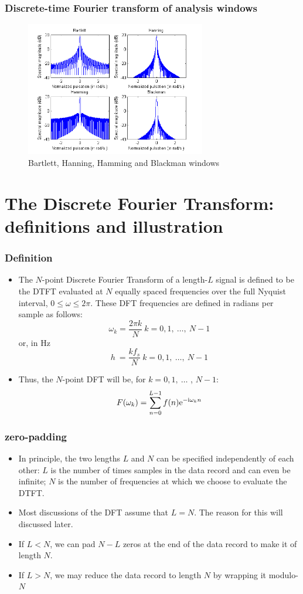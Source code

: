 \begin{frame}
\frametitle{Discrete-time Fourier transform of analysis windows}
\begin{figure}
  \centering
  \includegraphics[width=0.7\textwidth]{spectralwindow}
  \caption{Bartlett, Hanning, Hamming and Blackman windows}
\end{figure}
\end{frame}


\section{The Discrete Fourier Transform: definitions and illustration}
\begin{frame}
\frametitle{Definition}
\begin{itemize}
\item The $N$-point \alert{Discrete Fourier Transform} of a length-$L$ signal is defined to be the DTFT evaluated at $N$ equally spaced frequencies over the full Nyquist interval, $ 0\leq\omega\leq 2\pi$. These \alert{DFT frequencies} are defined in radians per sample as follows:
$$
\omega_{k}=\frac{2\pi k}{N}\ k=0,1,\ \ldots,\ N-1
$$
or, in Hz
$$
h\ =\frac{kf_{s}}{N}\ k=0,1,\ \ldots,\ N-1
$$
\item Thus, the $N$-point DFT will be, for $k=0,1,\ \ldots$ , $N -1$:
\[
F(\omega_k)= \sum_{n=0}^{L-1} f(n) \mathrm{e}^{-\mathrm{i} \omega_k n}
\]
\end{itemize}
\end{frame}

\begin{frame}
\frametitle{zero-padding}
\begin{itemize}
\item In principle, the two lengths $L$ and $N$ can be specified \alert{independently} of each other: $L$ is the number of \alert{times  samples} in the data record and can even be infinite; $N$ is the number of \alert{frequencies} at which we choose to evaluate the DTFT.
\item Most discussions of the DFT assume that $L=N$. The reason for this will discussed later.
\item If $L<N$, we can \alert{pad} $N-L$ zeros at the end of the data record to make it of length $N$.
\item If $L>N$, we may reduce the data record to length $N$ by \alert{wrapping} it modulo-$N$
\end{itemize}
\end{frame}


